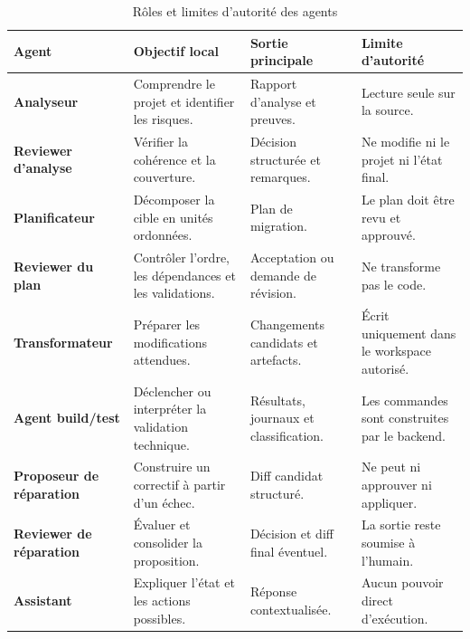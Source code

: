 \begin{table}[H]
    \centering
    \scriptsize
    \begin{tabularx}{\textwidth}{|>{\bfseries\RaggedRight\arraybackslash}p{2.8cm}|>{\RaggedRight\arraybackslash}p{3.4cm}|>{\RaggedRight\arraybackslash}p{3.5cm}|>{\RaggedRight\arraybackslash}X|}
        \hline
        \rowcolor{cgilight!95}
        \textbf{Agent} & \textbf{Objectif local} & \textbf{Sortie principale} & \textbf{Limite d'autorité} \\
        \hline
        Analyseur & Comprendre le projet et identifier les risques. & Rapport d'analyse et preuves. & Lecture seule sur la source. \\
        \hline
        Reviewer d'analyse & Vérifier la cohérence et la couverture. & Décision structurée et remarques. & Ne modifie ni le projet ni l'état final. \\
        \hline
        Planificateur & Décomposer la cible en unités ordonnées. & Plan de migration. & Le plan doit être revu et approuvé. \\
        \hline
        Reviewer du plan & Contrôler l'ordre, les dépendances et les validations. & Acceptation ou demande de révision. & Ne transforme pas le code. \\
        \hline
        Transformateur & Préparer les modifications attendues. & Changements candidats et artefacts. & Écrit uniquement dans le workspace autorisé. \\
        \hline
        Agent build/test & Déclencher ou interpréter la validation technique. & Résultats, journaux et classification. & Les commandes sont construites par le backend. \\
        \hline
        Proposeur de réparation & Construire un correctif à partir d'un échec. & Diff candidat structuré. & Ne peut ni approuver ni appliquer. \\
        \hline
        Reviewer de réparation & Évaluer et consolider la proposition. & Décision et diff final éventuel. & La sortie reste soumise à l'humain. \\
        \hline
        Assistant & Expliquer l'état et les actions possibles. & Réponse contextualisée. & Aucun pouvoir direct d'exécution. \\
        \hline
    \end{tabularx}
    \caption{Rôles et limites d'autorité des agents}
    \label{tab:roles-agents-ch3}
\end{table}

